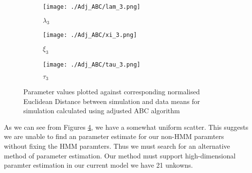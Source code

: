 \begin{figure}
    \begin{subfigure}{.3\textwidth}
      \centering
      \texttt{[image: ./Adj\_ABC/lam\_3.png]}
      \caption{$\lambda_3$}
      \label{adj:1}
    \end{subfigure}
    \begin{subfigure}{.3\textwidth}
      \centering
      \texttt{[image: ./Adj\_ABC/xi\_3.png]}
      \caption{$\xi_3$}
      \label{adj:2}
    \end{subfigure}
    \begin{subfigure}{.3\textwidth}
        \centering
        \texttt{[image: ./Adj\_ABC/tau\_3.png]}
        \caption{$\tau_3$}
        \label{adj:3}
    \end{subfigure}

    \caption{Parameter values plotted against corresponding normalised Euclidean Distance between simulation and data means for simulation calculated using adjusted ABC algorithm}
    \label{adj}
\end{figure}


As we can see from Figures \ref{adj}, we have a somewhat uniform scatter. This suggests we are unable to find an parameter estimate for our non-HMM paramters without fixing the HMM paramters. Thus we must search for an alternative method of parameter estimation. Our method must support high-dimensional paramter estimation in our current model we have 21 unkowns. 
